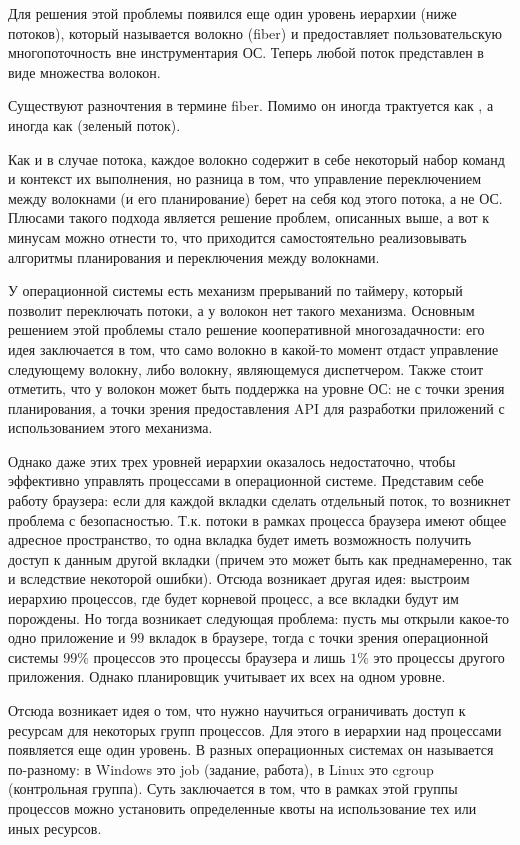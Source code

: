 Для решения этой проблемы появился еще один уровень иерархии (ниже потоков),
который называется волокно (fiber) и предоставляет пользовательскую
многопоточность вне инструментария ОС. Теперь любой поток представлен в виде
множества волокон.

\begin{remark}
  Существуют разночтения в термине fiber. Помимо  он иногда
  трактуется как , а иногда как 
  (зеленый поток).
\end{remark}

Как и в случае потока, каждое волокно содержит в себе некоторый набор команд и
контекст их выполнения, но разница в том, что управление переключением между
волокнами (и его планирование) берет на себя код этого потока, а не ОС. Плюсами
такого подхода является решение проблем, описанных выше, а вот к минусам можно
отнести то, что приходится самостоятельно реализовывать алгоритмы планирования и
переключения между волокнами.

У операционной системы есть механизм прерываний по таймеру, который позволит
переключать потоки, а у волокон нет такого механизма. Основным решением этой
проблемы стало решение кооперативной многозадачности: его идея заключается в
том, что само волокно в какой-то момент отдаст управление следующему волокну,
либо волокну, являющемуся диспетчером. Также стоит отметить, что у волокон может
быть поддержка на уровне ОС: не с точки зрения планирования, а точки зрения
предоставления API для разработки приложений с использованием этого механизма.

Однако даже этих трех уровней иерархии оказалось недостаточно, чтобы эффективно
управлять процессами в операционной системе. Представим себе работу браузера:
если для каждой вкладки сделать отдельный поток, то возникнет проблема с
безопасностью. Т.к. потоки в рамках процесса браузера имеют общее адресное
пространство, то одна вкладка будет иметь возможность получить доступ к данным
другой вкладки (причем это может быть как преднамеренно, так и вследствие
некоторой ошибки). Отсюда возникает другая идея: выстроим иерархию процессов,
где будет корневой процесс, а все вкладки будут им порождены. Но тогда возникает
следующая проблема: пусть мы открыли какое-то одно приложение и \(99\) вкладок в
браузере, тогда с точки зрения операционной системы \(99\%\) процессов это
процессы браузера и лишь \(1\%\) это процессы другого приложения. Однако
планировщик учитывает их всех на одном уровне.

Отсюда возникает идея о том, что нужно научиться ограничивать доступ к ресурсам
для некоторых групп процессов. Для этого в иерархии над процессами появляется
еще один уровень. В разных операционных системах он называется по-разному: в
Windows это job (задание, работа), в Linux это cgroup (контрольная группа). Суть
заключается в том, что в рамках этой группы процессов можно установить
определенные квоты на использование тех или иных ресурсов.

